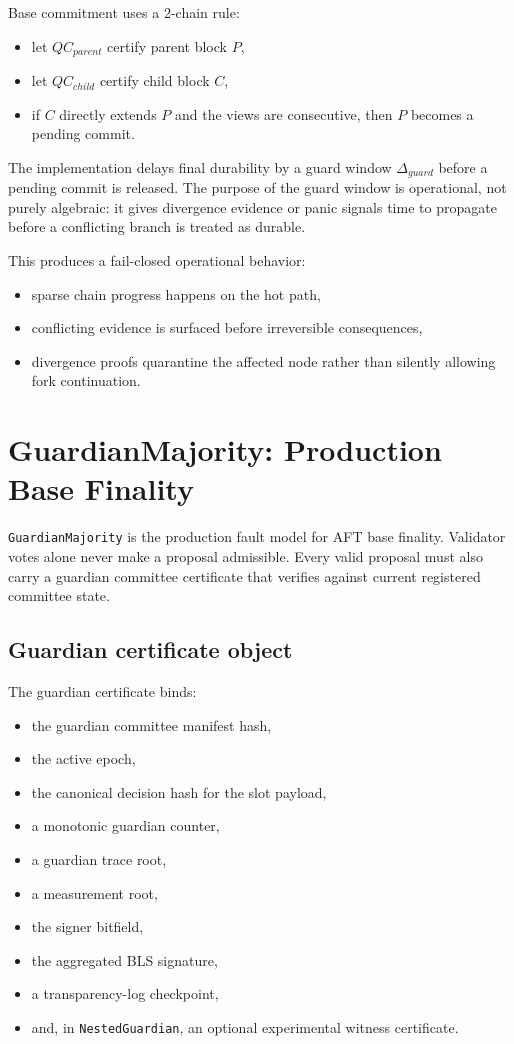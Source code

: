 \documentclass[11pt]{article}
\newcommand{\AFT}{\textsc{AFT}}
\newcommand{\code}[1]{\texttt{#1}}
\begin{document}
Base commitment uses a 2-chain rule:

\begin{itemize}[leftmargin=1.5em]
\item let \(QC_{parent}\) certify parent block \(P\),
\item let \(QC_{child}\) certify child block \(C\),
\item if \(C\) directly extends \(P\) and the views are consecutive, then
\(P\) becomes a pending commit.
\end{itemize}

The implementation delays final durability by a guard window
\(\Delta_{guard}\) before a pending commit is released. The purpose of the
guard window is operational, not purely algebraic: it gives divergence
evidence or panic signals time to propagate before a conflicting branch is
treated as durable.

This produces a fail-closed operational behavior:

\begin{itemize}[leftmargin=1.5em]
\item sparse chain progress happens on the hot path,
\item conflicting evidence is surfaced before irreversible consequences,
\item divergence proofs quarantine the affected node rather than silently
allowing fork continuation.
\end{itemize}

\section{GuardianMajority: Production Base Finality}

\code{GuardianMajority} is the production fault model for \AFT{} base finality.
Validator votes alone never make a proposal admissible. Every valid proposal
must also carry a guardian committee certificate that verifies against current
registered committee state.

\subsection{Guardian certificate object}

The guardian certificate binds:

\begin{itemize}[leftmargin=1.5em]
\item the guardian committee manifest hash,
\item the active epoch,
\item the canonical decision hash for the slot payload,
\item a monotonic guardian counter,
\item a guardian trace root,
\item a measurement root,
\item the signer bitfield,
\item the aggregated BLS signature,
\item a transparency-log checkpoint,
\item and, in \code{NestedGuardian}, an optional experimental witness
certificate.
\end{itemize}
\end{document}
